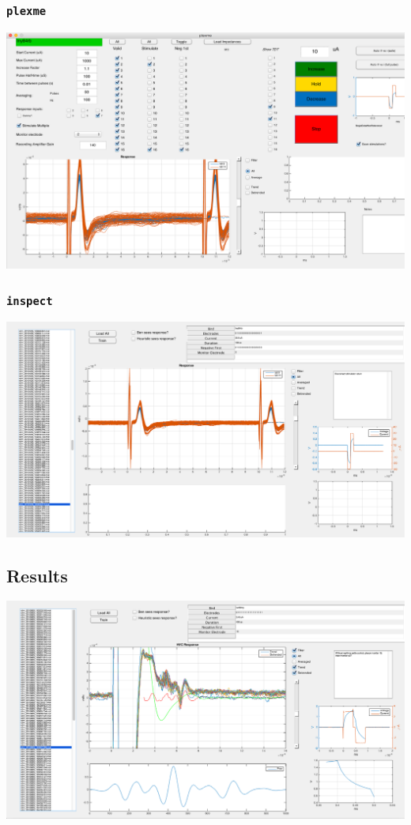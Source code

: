 \documentclass{beamer}
\begin{document}
\begin{frame}
  \frametitle{{\tt plexme}}
  \includegraphics[width=\textwidth]{plexme-faked}
\end{frame}

\begin{frame}
  \frametitle{{\tt inspect}}
  \includegraphics[width=\textwidth]{inspect-example-1}
\end{frame}


\subsection{Results}

\begin{frame}
  \includegraphics[width=\textwidth]{inspect-example-0}
\end{frame}
\end{document}
